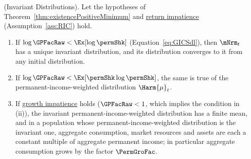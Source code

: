 \documentclass[\econtexRoot/BufferStockTheory]{subfiles}
\begin{document}
\begin{proposition}(Invariant Distributions).\label{prop:invariantPositiveMinimum}
Let the hypotheses of Theorem~\ref{thm:existencePositiveMinimum} and \hyperlink{RIC}{return impatience} (Assumption~\ref{ass:RIC}) hold.
\begin{enumerate}[label=(\roman*)]
\item If $\log\GPFacRaw<\Ex[\log\permShk]$ (Equation~\eqref{eq:GICSdl}), then $\mNrm_{t}$ has a unique invariant distribution, and its distribution converges to it from any initial distribution.
\item If $\log\GPFacRaw<\Ex[\permShk\log\permShk]$, the same is true of the permanent-income-weighted distribution $\Harm{\mu}_{t}$.
\item If \hyperlink{GICRaw}{growth impatience} holds ($\GPFacRaw<1$, which implies the condition in (ii)), the invariant permanent-income-weighted distribution has a finite mean, and in a population whose permanent-income-weighted distribution is the invariant one, aggregate consumption, market resources and assets are each a constant multiple of aggregate permanent income; in particular aggregate consumption grows by the factor $\PermGroFac$.
\end{enumerate}
\end{proposition}
\end{document}

